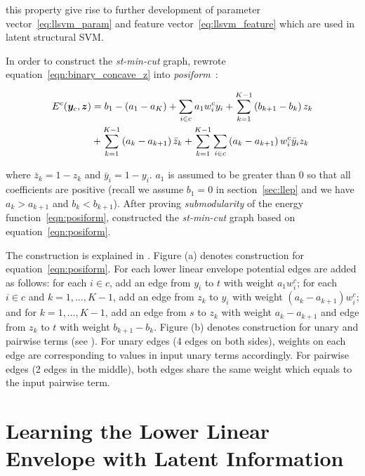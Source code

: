 \noindent this property give rise to further development of
parameter vector~\eqref{eq:llsvm_param} and feature
vector~\eqref{eq:llsvm_feature} which are used in latent
structural SVM.

In order to construct the \emph{st-min-cut} graph,
 rewrote
equation~\eqref{eqn:binary_concave_z} into
\emph{posiform}~\cite{Boros:MATH02}:

\begin{align}
  \label{eqn:posiform}  
  E^c({\bm{y}}_c, {\bm{z}})
  &= b_1 - (a_1 - a_K) + \sum_{i \in c} a_1 w^c_i y_i
  {}+ \sum_{k = 1}^{K - 1} \left( b_{k+1} - b_k \right) z_k\\
  &+ \sum_{k = 1}^{K - 1} \left( a_k - a_{k+1} \right) \bar{z}_k
  {}+ \sum_{k = 1}^{K - 1} \sum_{i \in c} \left( a_k - a_{k+1}
    \right) w^c_i \bar{y}_i z_k \nonumber
\end{align}

\noindent where $\bar{z}_k = 1 - z_k$ and $\bar{y}_i = 1 - y_i$.
$a_1$ is assumed to be greater than $0$ so that all coefficients
are positive (recall we assume $b_1=0$ in section~\ref{sec:llep}
and we have $a_k > a_{k+1}$ and $b_k < b_{k+1}$). After proving
\emph{submodularity} of the energy function~\eqref{eqn:posiform},
 constructed the \emph{st-min-cut} graph
based on equation~\eqref{eqn:posiform}.

The construction is explained in . Figure
(a) denotes construction for equation~\eqref{eqn:posiform}. For
each lower linear envelope potential edges are added as follows:
for each $i \in c$, add an edge from $y_i$ to $t$ with weight
$a_1 w^c_i$; for each $i \in c$ and $k = 1, \ldots, K-1$, add an
edge from $z_k$ to $y_i$ with weight $(a_{k} - a_{k+1}) w^c_i$;
and for $k = 1, \ldots, K-1$, add an edge from $s$ to $z_k$ with
weight $a_k - a_{k+1}$ and edge from $z_k$ to $t$ with weight
$b_{k+1} - b_k$. Figure (b) denotes construction for unary and
pairwise terms (see \cite{Kolmogorov:PAMI04}). For unary edges (4
edges on both sides), weights on each edge are corresponding to
values in input unary terms accordingly. For pairwise edges (2
edges in the middle), both edges share the same weight which
equals to the input pairwise term.

\section{Learning the Lower Linear Envelope with Latent Information}
\label{sec:learning}

